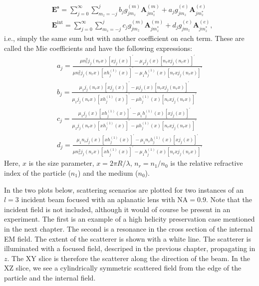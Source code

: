 \begin{align}
& \mathbf{E}^{\mathbf{s}} = \sum_{j=0}^{\infty} \sum_{m_z=-j}^j b_j g_{jm_z}^{(m)} \mathbf{A}_{j m_z^*}^{(m)} + a_j g_{jm_z}^{(e)} \mathbf{A}_{j m_z^*}^{(e)} \label{eq:Mie_S} \\
& \mathbf{E}^{\mathrm{int}} = \sum_{j=0}^{\infty} \sum_{m_z=-j}^j c_j g_{jm_z}^{(m)} \mathbf{A}_{j m_z^*}^{(m)} + d_j g_{jm_z}^{(e)} \mathbf{A}_{j m_z^*}^{(e)} \label{eq:Mie_I},
\end{align}
i.e., simply the same sum but with another coefficient on each term. These are called the Mie coefficients and have the following expressions:
\begin{gather}
a_j = \frac{\mu n_r^2 j_j(n_r x) \left[ x j_j(x) \right]^{\prime} - \mu_1 j_j(x) \left[ n_r x j_j(n_r x) \right]^{\prime}}{\mu n_r^2 j_j(n_r x) \left[ x h_j^{(1)}(x) \right]^{\prime} - \mu_1 h_j^{(1)}(x) \left[ n_r x j_j(n_r x) \right]^{\prime}} \\
b_j = \frac{\mu_1 j_j(n_r x) \left[ x j_j(x) \right]^{\prime} - \mu j_j(x) \left[ n_r x j_j(n_r x) \right]^{\prime}}{\mu_1 j_j(n_r x) \left[ x h_j^{(1)}(x) \right]^{\prime} - \mu h_j^{(1)}(x) \left[ n_r x j_j(n_r x) \right]^{\prime}} \\
c_j = \frac{\mu_1 j_j(x) \left[ x h_j^{(1)}(x) \right]^{\prime} - \mu_1 h_j^{(1)}(x) \left[ x j_j(x) \right]^{\prime}}{\mu_1 j_j(n_r x) \left[ x h_j^{(1)}(x) \right]^{\prime} - \mu h_j^{(1)}(x) \left[ n_r x j_j(n_r x) \right]^{\prime}} \\
d_j = \frac{\mu_1 n_r j_j(x) \left[ x h_j^{(1)}(x) \right]^{\prime} - \mu_1 n_r h_j^{(1)}(x) \left[ x j_j(x) \right]^{\prime}}{\mu n_r^2 j_j(n_r x) \left[ x h_j^{(1)}(x) \right]^{\prime} - \mu_1 h_j^{(1)}(x) \left[ n_r x j_j(n_r x) \right]^{\prime}}
\end{gather}
Here, \( x \) is the size parameter, \( x = 2 \pi R / \lambda \), \( n_r = n_1 / n_0 \) is the relative refractive index of the particle (\( n_1 \)) and the medium (\( n_0 \)).

In the two plots below, scattering scenarios are plotted for two instances of an \( l = 3 \) incident beam focused with an aplanatic lens with \( \mathrm{NA} = 0.9 \). Note that the incident field is not included, although it would of course be present in an experiment.
The first is an example of a high helicity preservation case mentioned in the next chapter. The second is a resonance in the cross section of the internal EM field. The extent of the scatterer is shown with a white line. The scatterer is illuminated with a focused field, descriped in the previous chapter, propagating in \( z \). The XY slice is therefore the scatterer along the direction of the beam. In the XZ slice, we see a cylindrically symmetric scattered field from the edge of the particle and the internal field.

